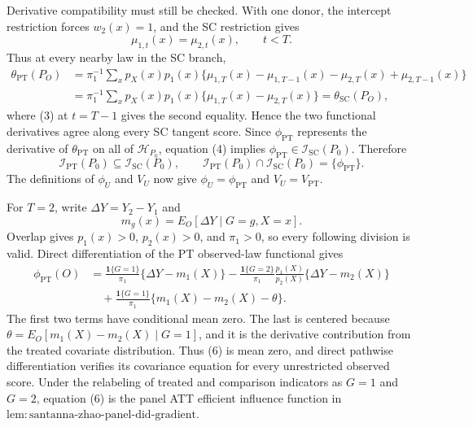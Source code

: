 Derivative compatibility must still be checked. With one donor, the intercept restriction forces \(w_2(x)=1\), and the SC restriction gives
\[
 \mu_{1,t}(x)=\mu_{2,t}(x),
 \qquad t<T.
 \tag{3}
\]
Thus at every nearby law in the SC branch,
\[
 \begin{aligned}
 \theta_{\mathrm{PT}}(P_O)
 &=\pi_1^{-1}\sum_xp_X(x)p_1(x)
 \{\mu_{1,T}(x)-\mu_{1,T-1}(x)-\mu_{2,T}(x)+\mu_{2,T-1}(x)\}\\
 &=\pi_1^{-1}\sum_xp_X(x)p_1(x)
 \{\mu_{1,T}(x)-\mu_{2,T}(x)\}
 =\theta_{\mathrm{SC}}(P_O),
 \end{aligned}
 \tag{4}
\]
where (3) at \(t=T-1\) gives the second equality. Hence the two functional derivatives agree along every SC tangent score. Since \(\phi_{\mathrm{PT}}\) represents the derivative of \(\theta_{\mathrm{PT}}\) on all of \(\mathcal H_{P_0}\), equation (4) implies \(\phi_{\mathrm{PT}}\in\mathcal I_{\mathrm{SC}}(P_0)\). Therefore
\[
 \mathcal I_{\mathrm{PT}}(P_0)\subseteq\mathcal I_{\mathrm{SC}}(P_0),
 \qquad
 \mathcal I_{\mathrm{PT}}(P_0)\cap\mathcal I_{\mathrm{SC}}(P_0)
 =\{\phi_{\mathrm{PT}}\}.
 \tag{5}
\]
The definitions of \(\phi_U\) and \(V_U\) now give \(\phi_U=\phi_{\mathrm{PT}}\) and \(V_U=V_{\mathrm{PT}}\).

For \(T=2\), write \(\Delta Y=Y_2-Y_1\) and
\[
 m_g(x)=E_O[\Delta Y\mid G=g,X=x].
\]
Overlap gives \(p_1(x)>0\), \(p_2(x)>0\), and \(\pi_1>0\), so every following division is valid. Direct differentiation of the PT observed-law functional gives
\[
 \begin{aligned}
 \phi_{\mathrm{PT}}(O)
 &=\frac{\mathbf 1\{G=1\}}{\pi_1}\{\Delta Y-m_1(X)\}
 -\frac{\mathbf 1\{G=2\}}{\pi_1}\frac{p_1(X)}{p_2(X)}
   \{\Delta Y-m_2(X)\}\\
 &\quad+\frac{\mathbf 1\{G=1\}}{\pi_1}
 \{m_1(X)-m_2(X)-\theta\}.
 \end{aligned}
 \tag{6}
\]
The first two terms have conditional mean zero. The last is centered because \(\theta=E_O[m_1(X)-m_2(X)\mid G=1]\), and it is the derivative contribution from the treated covariate distribution. Thus (6) is mean zero, and direct pathwise differentiation verifies its covariance equation for every unrestricted observed score. Under the relabeling of treated and comparison indicators as \(G=1\) and \(G=2\), equation (6) is the panel ATT efficient influence function in \(\mathrm{lem{:}santanna\text{-}zhao\text{-}panel\text{-}did\text{-}gradient}\).

